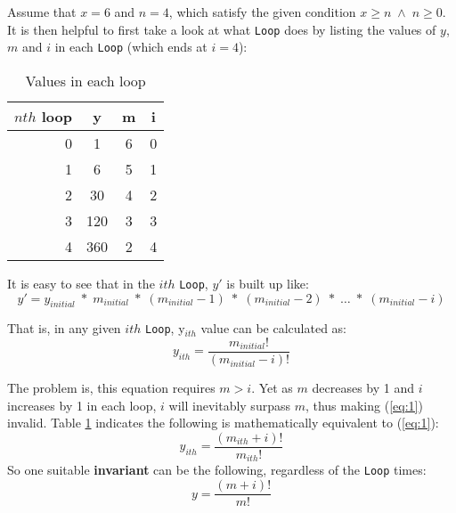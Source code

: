 Assume that $x = 6$ and $n = 4$, which satisfy the given condition $ x \geq n \;\land\; n \geq 0$.  It is then helpful to first take a look at what \texttt{Loop} does by listing the values of $y$, $m$ and $i$ in each \texttt{Loop} (which ends at $i = 4$):

\begin{table}[h]
  \centering
  \begin{tabular}{r||c|c|c}
    \hline
    $nth$ loop & y & m & i \\
    \hline
    0 & 1 & 6 & 0 \\
    1 & 6 & 5 & 1 \\
    2 & 30 & 4 & 2 \\
    3 & 120 & 3 & 3 \\
    4 & 360 & 2 & 4 \\
    \hline
  \end{tabular}
  \caption{Values in each loop}
  \label{tab:loop}
\end{table}

It is easy to see that in the $ith$ \texttt{Loop}, $y'$ is built up like:
\[
  y' =
  y_{initial} \;*\; m_{initial}\;*\;(m_{initial} - 1)\;*\;(m_{initial}-  2)\;*\;\ldots\;*\; (m_{initial} - i)
\]

That is, in any given $ith$ \texttt{Loop},  y$_{ith}$ value can be calculated as:
\begin{equation}
\label{eq:1}
y_{ith} = \frac{m_{initial}!}{(m_{initial} - i)!}
\end{equation}

The problem is, this equation requires $m > i$.  Yet as $m$ decreases by 1 and $i$ increases by 1 in each loop, $i$ will inevitably surpass $m$, thus making (\ref{eq:1}) invalid.  Table \ref{tab:loop} indicates the following is mathematically equivalent to (\ref{eq:1}):
\[
y_{ith} = \frac{(m_{ith}+i)!}{m_{ith}!}
\]
So one suitable \textbf{invariant} can be the following, regardless of the \texttt{Loop} times:
\begin{equation}
\label{eq:2}
  y = \frac{(m+i)!}{m!}
\end{equation}
